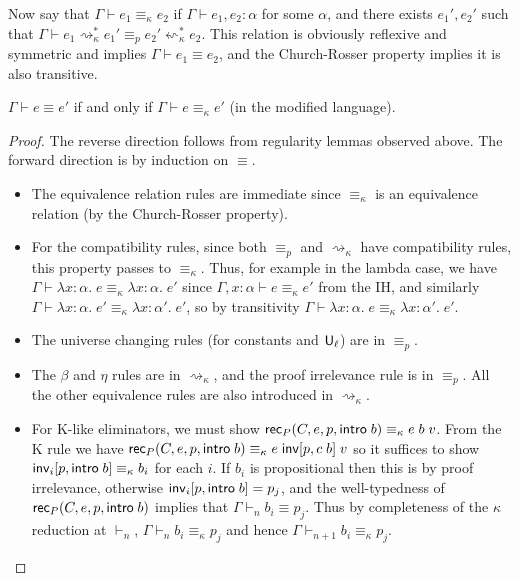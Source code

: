Now say that $\Gamma\vdash e_1\equiv_\kappa e_2$ if $\Gamma\vdash e_1,e_2:\alpha$ for some $\alpha$, and there exists $e_1',e_2'$ such that $\Gamma\vdash e_1\rightsquigarrow_\kappa^* e_1'\equiv_p e_2'\leftsquigarrow_\kappa^* e_2$. This relation is obviously reflexive and symmetric and implies $\Gamma\vdash e_1\equiv e_2$, and the Church-Rosser property implies it is also transitive.

\begin{theorem}\label{thm:ckappa}
$\Gamma\vdash e\equiv e'$ if and only if $\Gamma\vdash e\equiv_\kappa e'$ (in the modified language).
\end{theorem}
\begin{proof}
The reverse direction follows from regularity lemmas observed above. The forward direction is by induction on $\equiv$.
\begin{itemize}
\item The equivalence relation rules are immediate since $\equiv_\kappa$ is an equivalence relation (by the Church-Rosser property).
\item For the compatibility rules, since both $\equiv_p$ and $\rightsquigarrow_\kappa$ have compatibility rules, this property passes to $\equiv_\kappa$. Thus, for example in the lambda case, we have $\Gamma\vdash\lambda x:\alpha.\;e\equiv_\kappa\lambda x:\alpha.\;e'$ since $\Gamma,x:\alpha\vdash e\equiv_\kappa e'$ from the IH, and similarly $\Gamma\vdash\lambda x:\alpha.\;e'\equiv_\kappa\lambda x:\alpha'.\;e'$, so by transitivity $\Gamma\vdash\lambda x:\alpha.\;e\equiv_\kappa\lambda x:\alpha'.\;e'$.
\item The universe changing rules (for constants and $\mathsf{U}_\ell$) are in $\equiv_p$.
\item The $\beta$ and $\eta$ rules are in $\rightsquigarrow_\kappa$, and the proof irrelevance rule is in $\equiv_p$. All the other equivalence rules are also introduced in $\rightsquigarrow_\kappa$.
\item For K-like eliminators, we must show $\mathsf{rec}_P(C,e,p,\mathsf{intro}\;b)\equiv_\kappa e\;b\;v$. From the K rule we have $\mathsf{rec}_P(C,e,p,\mathsf{intro}\;b)\equiv_\kappa e\;\mathsf{inv}[p,c\;b]\;v$ so it suffices to show $\mathsf{inv}_i[p,\mathsf{intro}\;b]\equiv_\kappa b_i$ for each $i$. If $b_i$ is propositional then this is by proof irrelevance, otherwise $\mathsf{inv}_i[p,\mathsf{intro}\;b]=p_j$, and the well-typedness of $\mathsf{rec}_P(C,e,p,\mathsf{intro}\;b)$ implies that $\Gamma\vdash_n b_i\equiv p_j$. Thus by completeness of the $\kappa$ reduction at $\vdash_n$, $\Gamma\vdash_n b_i\equiv_\kappa p_j$ and hence $\Gamma\vdash_{n+1} b_i\equiv_\kappa p_j$.
\end{itemize}
\end{proof}

